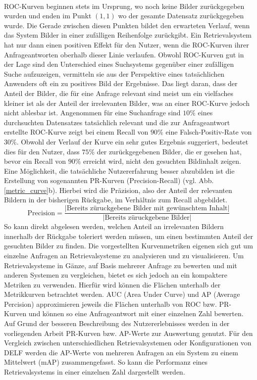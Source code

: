 \\
ROC-Kurven beginnen stets im Ursprung, wo noch keine Bilder zurückgegeben wurden und enden im Punkt $(1,1)$ wo der gesamte Datensatz zurückgegeben wurde. Die Gerade zwischen diesen Punkten bildet den erwarteten Verlauf, wenn das System Bilder in einer zufälligen Reihenfolge zurückgibt. Ein Retrievalsystem hat nur dann einen positiven Effekt für den Nutzer, wenn die ROC-Kurven ihrer Anfrageantworten oberhalb dieser Linie verlaufen. Obwohl ROC-Kurven gut in der Lage sind den Unterschied eines Suchsystems gegenüber einer zufälligen Suche aufzuzeigen, vermitteln sie aus der Perspektive eines tatsächlichen Anwenders oft ein zu positives Bild der Ergebnisse. Das liegt daran, dass der Anteil der Bilder, die für eine Anfrage relevant sind meist um ein vielfaches kleiner ist als der Anteil der irrelevanten Bilder, was an einer ROC-Kurve jedoch nicht ablesbar ist. Angenommen für eine Suchanfrage sind $10\%$ eines durchsuchten Datensatzes tatsächlich relevant und die zur Anfrageantwort erstellte ROC-Kurve zeigt bei einem Recall von $90\%$ eine Falsch-Positiv-Rate von $30\%$. Obwohl der Verlauf der Kurve ein sehr gutes Ergebnis suggeriert, bedeutet dies für den Nutzer, dass $75\%$ der zurückgegebenen Bilder, die er gesehen hat, bevor ein Recall von $90\%$ erreicht wird, nicht den gesuchten Bildinhalt zeigen. Eine Möglichkeit, die tatsächliche Nutzererfahrung besser abzubilden ist die Erstellung von sogenannten PR-Kurven (Precision-Recall) (vgl. Abb. \ref{metric_curve}b). Hierbei wird die Präzision, also der Anteil der relevanten Bildern in der bisherigen Rückgabe, im Verhältnis zum Recall abgebildet.
\begin{equation}
\text{Precision} = \frac{|\text{Bereits züruckgebene Bilder mit gewünschtem Inhalt}|}{|\text{Bereits züruckgebene Bilder}|}
\end{equation}
So kann direkt abgelesen werden, welchen Anteil an irrelevanten Bildern innerhalb der Rückgabe toleriert werden müssen, um einen bestimmten Anteil der gesuchten Bilder zu finden.
Die vorgestellten Kurvenmetriken eigenen sich gut um einzelne Anfragen an Retrievalsysteme zu analysieren und zu visualisieren. Um Retrievalsysteme in Gänze, auf Basis mehrerer Anfrage zu bewerten und mit anderen Systemen zu vergleichen, bietet es sich jedoch an ein kompaktere Metriken zu verwenden. Hierfür wird können die Flächen unterhalb der Metrikkurven betrachtet werden. AUC (Area Under Curve) und AP (Average Percision) approximieren jeweils die Flächen unterhalb von ROC bzw. PR-Kurven und können so eine Anfrageantwort mit einer einzelnen Zahl bewerten. Auf Grund der besseren Beschreibung des Nutzererlebnisses werden in der vorliegenden Arbeit PR-Kurven bzw. AP-Werte zur Auswertung genutzt. Für den Vergleich zwischen unterschiedlichen Retrievalsystemen oder Konfigurationen von DELF werden die AP-Werte von mehreren Anfragen an ein System zu einem Mittelwert (mAP) zusammengefasst. So kann die Performanz eines Retrievalsystems in einer einzelnen Zahl dargestellt werden. 
 

